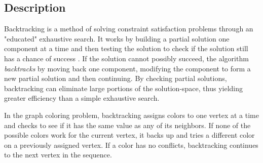 \documentclass{article}
\begin{document}
	\subsection{Description}
		\label{simpe_desc}
		Backtracking is a method of solving constraint satisfaction problems through an "educated" exhaustive search. It works by building a partial solution one component at a time and then testing the solution to check if the solution still has a chance of success \cite{Golomb}. If the solution cannot possibly succeed, the algorithm \textit{backtracks} by moving back one component, modifying the component to form a new partial solution and then continuing. By checking partial solutions, backtracking can eliminate large portions of the solution-space, thus yielding greater efficiency than a simple exhaustive search.
		
		In the graph coloring problem, backtracking assigns colors to one vertex at a time and checks to see if it has the same value as any of its neighbors. If none of the possible colors work for the current vertex, it backs up and tries a different color on a previously assigned vertex. If a color has no conflicts, backtracking continues to the next vertex in the sequence.
		
\end{document}
